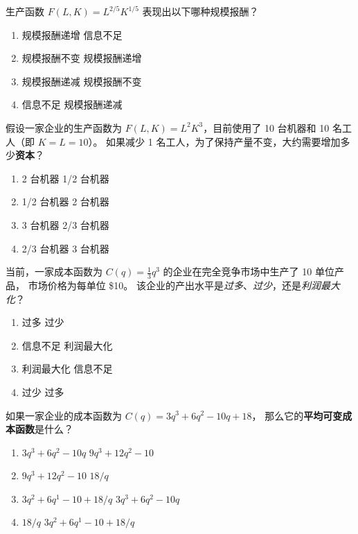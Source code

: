 \begin{question}[type=exam]{3}
  生产函数 $F(L,K)=L^{2/5}K^{1/5}$ 表现出以下哪种规模报酬？
  \begin{enumerate}[label=\alph*), noitemsep]
    \item \vary
      {规模报酬递增}
      {信息不足}
    \item \vary
      {规模报酬不变}
      {规模报酬递增}
    \item \vary
      {规模报酬递减} %
      {规模报酬不变}
    \item \vary
      {信息不足}
      {规模报酬递减} %
  \end{enumerate}
\end{question}

\begin{question}[type=exam]{3}
  假设一家企业的生产函数为 $F(L,K)=L^{2}K^{3}$，目前使用了 10 台机器和 10 名工人（即 $K=L=10$）。
  如果减少 1 名工人，为了保持产量不变，大约需要增加多少\textbf{资本}？
  \begin{enumerate}[label=\alph*), noitemsep]
    \item \vary
      {2 台机器}
      {1/2 台机器}
    \item \vary
      {1/2 台机器}
      {2 台机器}
    \item \vary
      {3 台机器}
      {2/3 台机器} %
    \item \vary
      {2/3 台机器} %
      {3 台机器}
  \end{enumerate}
\end{question}

\begin{question}[type=exam]{3}
  当前，一家成本函数为 $C(q)=\frac{1}{3}q^3$ 的企业在完全竞争市场中生产了 10 单位产品，
  市场价格为每单位 \$10。
  该企业的产出水平是\textit{过多}、\textit{过少}，还是\textit{利润最大化}？
  \begin{enumerate}[label=\alph*), noitemsep]
    \item \vary
      {过多}
      {过少}
    \item \vary
      {信息不足}
      {利润最大化} %
    \item \vary
      {利润最大化} %
      {信息不足}
    \item \vary
      {过少}
      {过多}
  \end{enumerate}
\end{question}

\begin{question}[type=exam]{3}
  如果一家企业的成本函数为 $C(q)=3q^3+6q^2-10q+18$，
  那么它的\textbf{平均可变成本函数}是什么？
  \begin{enumerate}[label=\alph*), noitemsep]
    \item \vary
      {$3q^3+6q^2-10q$}
      {$9q^3+12q^2-10$}
    \item \vary
      {$9q^3+12q^2-10$}
      {$18/q$}
    \item \vary
      {$3q^2+6q^1-10+18/q$} %
      {$3q^3+6q^2-10q$}
    \item \vary
      {$18/q$}
      {$3q^2+6q^1-10+18/q$} %
  \end{enumerate}
\end{question}

